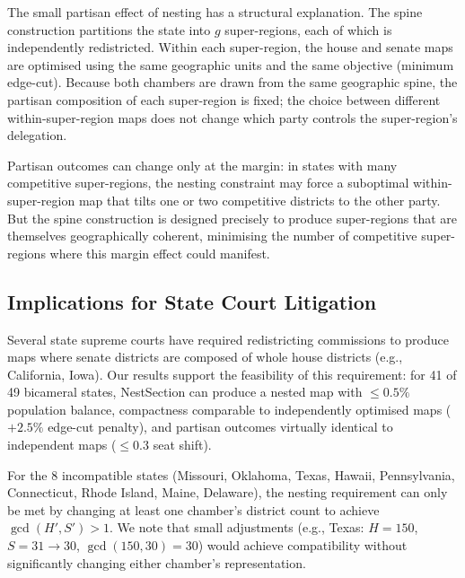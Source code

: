The small partisan effect of nesting has a structural explanation. The spine
construction partitions the state into $g$ super-regions, each of which is
independently redistricted. Within each super-region, the house and senate maps
are optimised using the same geographic units and the same objective (minimum
edge-cut). Because both chambers are drawn from the same geographic spine,
the partisan composition of each super-region is fixed; the choice between
different within-super-region maps does not change which party controls the
super-region's delegation.

Partisan outcomes can change only at the margin: in states with many competitive
super-regions, the nesting constraint may force a suboptimal within-super-region
map that tilts one or two competitive districts to the other party.
But the spine construction is designed precisely to produce super-regions that
are themselves geographically coherent, minimising the number of competitive
super-regions where this margin effect could manifest.

\subsection{Implications for State Court Litigation}
\label{sec:partisan:litigation}

Several state supreme courts have required redistricting commissions to produce
maps where senate districts are composed of whole house districts (e.g.,
California, Iowa). Our results support the feasibility of this requirement:
for 41 of 49 bicameral states, NestSection can produce a nested map with
$\leq 0.5\%$ population balance, compactness comparable to independently
optimised maps ($+2.5\%$ edge-cut penalty), and partisan outcomes virtually
identical to independent maps ($\leq 0.3$ seat shift).

For the 8 incompatible states (Missouri, Oklahoma, Texas, Hawaii, Pennsylvania,
Connecticut, Rhode Island, Maine, Delaware), the nesting requirement can only
be met by changing at least one chamber's district count to achieve
$\gcd(H', S') > 1$. We note that small adjustments (e.g., Texas: $H=150$,
$S=31 \to 30$, $\gcd(150,30) = 30$) would achieve compatibility without
significantly changing either chamber's representation.
